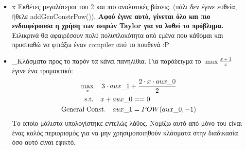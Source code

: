 \documentclass[a4paper,twoside,10pt]{article}
\begin{document}
\begin{itemize}[label={}]
\begin{itemize}[label={}]
\begin{lstlisting}
		\end{lstlisting}
		\item \lbrack x \rbrack Εκθέτες μεγαλύτεροι του 2 και πιο αναλυτικές βάσεις. (πάλι δεν έγινε ευθεία, ήθελε addGenConstrPow()). \textbf{ Αφού έγινε αυτό, γίνεται όλο και πιο ενδιαφέρουσα η χρήση των σειρών Taylor για να λυθεί το πρόβλημα.} Ειλικρινά θα αφαιρέσουν πολύ πολυπλοκότητα από εμένα που κάθομαι και προσπαθώ να φτιάξω έναν compiler από το πουθενά :Ρ
		\item \lbrack\_\rbrack Κλάσματα προς το παρόν τα κάνει πανηλίθια. Για παράδειγμα το $\max \frac{x+3}{x}$ έγινε ένα τρομακτικό:
		$$ 
		$$
		\begin{gather*}
			\max_{x}\quad 3 \cdot aux\_1 + \frac{2 \cdot x \cdot aux\_0}{2} \\
			\begin{aligned}
				\textup{s.t.}\quad x + aux\_0  &==  0\\
				\textup{General Const.} \quad aux\_1  &=  POW(aux\_0, -1) \\
			\end{aligned}
		\end{gather*}
		Το οποίο μάλιστα υπολογίστηκε εντελώς λάθος. Νομίζω αυτό από μόνο του είναι ένας καλός περιορισμός για να μην χρησιμοποιηθούν κλάσματα στην διαδικασία όσο αυτό είναι εφικτό. 
	\end{itemize}
	

\end{itemize}
\end{document}
